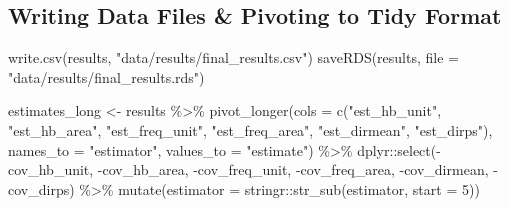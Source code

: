 \documentclass[12pt,twoside]{reedthesis}
\newenvironment{Shaded}{\begin{snugshade}}{\end{snugshade}}
\newcommand{\AttributeTok}[1]{\textcolor[rgb]{0.77,0.63,0.00}{#1}}
\newcommand{\DecValTok}[1]{\textcolor[rgb]{0.00,0.00,0.81}{#1}}
\newcommand{\FunctionTok}[1]{\textcolor[rgb]{0.00,0.00,0.00}{#1}}
\newcommand{\NormalTok}[1]{#1}
\newcommand{\OtherTok}[1]{\textcolor[rgb]{0.56,0.35,0.01}{#1}}
\newcommand{\SpecialCharTok}[1]{\textcolor[rgb]{0.00,0.00,0.00}{#1}}
\newcommand{\StringTok}[1]{\textcolor[rgb]{0.31,0.60,0.02}{#1}}
\begin{document}
\hypertarget{writing-data-files-pivoting-to-tidy-format}{%
\subsection{Writing Data Files \& Pivoting to Tidy Format}\label{writing-data-files-pivoting-to-tidy-format}}
\begin{Shaded}
\begin{Highlighting}[]
\FunctionTok{write.csv}\NormalTok{(results, }
          \StringTok{"data/results/final\_results.csv"}\NormalTok{)}
\FunctionTok{saveRDS}\NormalTok{(results,}
        \AttributeTok{file =} \StringTok{"data/results/final\_results.rds"}\NormalTok{)}
\end{Highlighting}
\end{Shaded}
\begin{Shaded}
\begin{Highlighting}[]
\NormalTok{estimates\_long }\OtherTok{\textless{}{-}}\NormalTok{ results }\SpecialCharTok{\%\textgreater{}\%}
  \FunctionTok{pivot\_longer}\NormalTok{(}\AttributeTok{cols =} \FunctionTok{c}\NormalTok{(}\StringTok{"est\_hb\_unit"}\NormalTok{, }\StringTok{"est\_hb\_area"}\NormalTok{,}
                        \StringTok{"est\_freq\_unit"}\NormalTok{, }\StringTok{"est\_freq\_area"}\NormalTok{, }
                        \StringTok{"est\_dirmean"}\NormalTok{, }\StringTok{"est\_dirps"}\NormalTok{),}
               \AttributeTok{names\_to =} \StringTok{"estimator"}\NormalTok{,}
               \AttributeTok{values\_to =} \StringTok{"estimate"}\NormalTok{) }\SpecialCharTok{\%\textgreater{}\%}
\NormalTok{  dplyr}\SpecialCharTok{::}\FunctionTok{select}\NormalTok{(}\SpecialCharTok{{-}}\NormalTok{cov\_hb\_unit, }\SpecialCharTok{{-}}\NormalTok{cov\_hb\_area,}
                \SpecialCharTok{{-}}\NormalTok{cov\_freq\_unit, }\SpecialCharTok{{-}}\NormalTok{cov\_freq\_area,}
                \SpecialCharTok{{-}}\NormalTok{cov\_dirmean, }\SpecialCharTok{{-}}\NormalTok{cov\_dirps) }\SpecialCharTok{\%\textgreater{}\%}
  \FunctionTok{mutate}\NormalTok{(}\AttributeTok{estimator =}\NormalTok{ stringr}\SpecialCharTok{::}\FunctionTok{str\_sub}\NormalTok{(estimator, }\AttributeTok{start =} \DecValTok{5}\NormalTok{))}


\end{Highlighting}
\end{Shaded}
\end{document}
